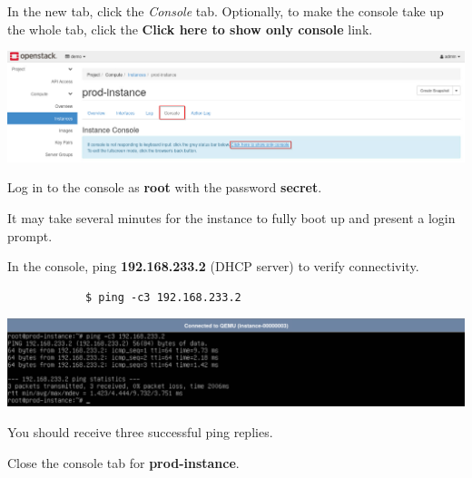 \documentclass[letterpaper, 12pt]{article}
\begin{document}
\begin{enumerate}
    \begin{labstep}
        In the new tab, click the \textit{Console} tab.
        Optionally, to make the console take up the whole tab, click the \textbf{Click here to show only console} link.

        \begin{center}
            \includegraphics[width=\linewidth]{images/part1/step12.png}
        \end{center}
    \end{labstep}

    \begin{labstep}
        Log in to the console as \textbf{root} with the password \textbf{secret}.
    \end{labstep}

    \begin{notebox}
        It may take several minutes for the instance to fully boot up and present a login prompt.
    \end{notebox}

    \begin{labstep}
        In the console, ping \textbf{192.168.233.2} (DHCP server) to verify connectivity.
        \begin{lstlisting}
            $ ping -c3 192.168.233.2
        \end{lstlisting}

        \begin{center}
            \includegraphics[width=\linewidth]{images/part1/step14.png}
        \end{center}
    \end{labstep}

    \begin{notebox}
        You should receive three successful ping replies.
    \end{notebox}

    \begin{labstep}
        Close the console tab for \textbf{prod-instance}.
    \end{labstep}


\end{enumerate}
\end{document}
